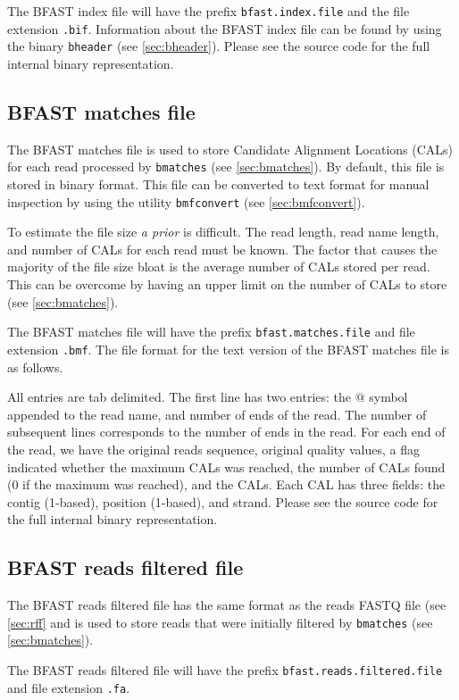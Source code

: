 \documentclass[a4paper,12pt]{book}
\newcommand{\TT}[1]{{\tt #1}} %
\newcommand{\IF}[1]{{\it #1}} %
\newcommand{\rFF}{reads FASTQ file}
\newcommand{\BIF}{BFAST index file} %
\newcommand{\BMF}{BFAST matches file} %
\newcommand{\BRFF}{BFAST reads filtered file} %
\begin{document}
The \BIF{} will have the prefix \TT{bfast.index.file} and the file extension \TT{.bif}.
Information about the \BIF{} can be found by using the binary \TT{bheader} (see \autoref{sec:bheader}).
Please see the source code for the full internal binary representation.

\subsection{\BMF{}}
\label{sec:bmf}
The \BMF{} is used to store Candidate Alignment Locations (CALs) for each read processed by \TT{bmatches} (see \autoref{sec:bmatches}).
By default, this file is stored in binary format.
This file can be converted to text format for manual inspection by using the utility \TT{bmfconvert} (see \autoref{sec:bmfconvert}).

To estimate the file size \IF{a prior} is difficult.
The read length, read name length, and number of CALs for each read must be known.
The factor that causes the majority of the file size bloat is the average number of CALs stored per read.
This can be overcome by having an upper limit on the number of CALs to store (see \autoref{sec:bmatches}).

The \BMF{} will have the prefix \TT{bfast.matches.file} and file extension \TT{.bmf}.
The file format for the text version of the \BMF{} is as follows.

All entries are tab delimited.
The first line has two entries: the @ symbol appended to the read name, and number of ends of the read.
The number of subsequent lines corresponds to the number of ends in the read.
For each end of the read, we have the original reads sequence, original quality values, a flag indicated whether the maximum CALs was reached, the number of CALs found (0 if the maximum was reached), and the CALs.
Each CAL has three fields: the contig (1-based), position (1-based), and strand.
Please see the source code for the full internal binary representation.

\subsection{\BRFF{}}
\label{sec:brff}
The \BRFF{} has the same format as the \rFF{} (see \autoref{sec:rff} and is used to store reads that were initially filtered by \TT{bmatches} (see \autoref{sec:bmatches}).

The \BRFF{} will have the prefix \TT{bfast.reads.filtered.file} and file extension \TT{.fa}.
\end{document}
